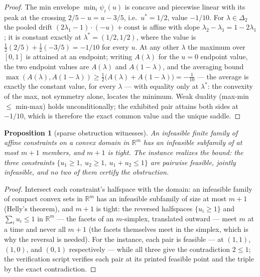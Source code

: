 \documentclass[10pt,twocolumn]{article}
\theoremstyle{plain}
\newtheorem{proposition}[theorem]{Proposition}
\theoremstyle{definition}
\theoremstyle{remark}
\begin{document}
\begin{proof}
The min envelope \(\min_i \psi_i(u)\) is concave and piecewise
linear with its peak at the crossing \(2/5 - u = u - 3/5\), i.e.\
\(u^{*} = 1/2\), value \(-1/10\). For \(\lambda \in \Delta_2\)
the pooled drift \((2\lambda_1 - 1)\cdot(-u) + \text{const}\) is
affine with slope \(\lambda_2 - \lambda_1 = 1 - 2\lambda_1\); it is
constant exactly at \(\lambda^{*} = (1/2, 1/2)\), where the value is
\(\tfrac12(2/5) + \tfrac12(-3/5) = -1/10\) for every \(u\). At any
other \(\lambda\) the maximum over \([0,1]\) is attained at an
endpoint; writing \(A(\lambda)\) for the \(u = 0\) endpoint value, the
two endpoint values are \(A(\lambda)\) and \(A(1 - \lambda)\), and
the averaging bound
\(\max(A(\lambda), A(1-\lambda)) \ge \tfrac12\bigl(A(\lambda) +
A(1-\lambda)\bigr) = -\tfrac1{10}\) --- the average is exactly the
constant value, for every \(\lambda\) --- with equality only at
\(\lambda^{*}\): the convexity of the max, not symmetry alone, locates
the minimum. Weak duality (max-min \(\le\) min-max)
holds unconditionally; the exhibited pair attains both sides at
\(-1/10\), which is therefore the exact common value and the unique
saddle.
\end{proof}

\begin{proposition}[sparse obstruction witnesses]\label{audit-prop:helly}
An infeasible finite family of affine constraints on a convex domain in
\(\mathbb{R}^m\) has an infeasible subfamily of at most \(m + 1\)
members, and \(m + 1\) is tight. The instance realizes the bound: the
three constraints \(\{u_1 \ge 1,\ u_2 \ge 1,\ u_1 + u_2 \le 1\}\)
are pairwise feasible, jointly infeasible, and no two of them certify
the obstruction.
\end{proposition}

\begin{proof}
Intersect each constraint's halfspace with the domain: an infeasible
family of compact convex sets in \(\mathbb{R}^m\) has an infeasible
subfamily of size at most \(m + 1\) (Helly's theorem), and \(m + 1\)
is tight: the reversed halfspaces \(\{u_i \ge 1\}\) and
\(\sum_i u_i \le 1\) in \(\mathbb{R}^m\) --- the facets of an
\(m\)-simplex, translated outward --- meet \(m\) at a time and never
all \(m+1\) (the facets themselves meet in the simplex, which is why
the reversal is needed). For the
instance, each pair is feasible --- at \((1,1)\), \((1,0)\), and
\((0,1)\) respectively --- while all three give the contradiction
\(2 \le 1\); the verification script verifies each pair at its printed
feasible point and the triple by the exact contradiction.
\end{proof}
\end{document}
